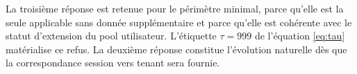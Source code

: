 La troisième réponse est retenue pour le périmètre minimal, parce qu'elle est la
seule applicable sans donnée supplémentaire et parce qu'elle est cohérente avec
le statut d'extension du pool utilisateur. L'étiquette $\tau = 999$ de
l'équation \eqref{eq:tau} matérialise ce refus. La deuxième réponse constitue
l'évolution naturelle dès que la correspondance session vers tenant sera
fournie.
